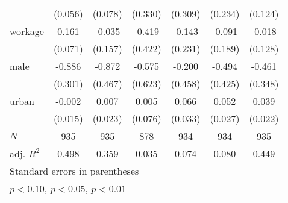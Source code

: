 {\begin{tabular}{l*{6}{c}}
            &     (0.056)         &     (0.078)         &     (0.330)         &     (0.309)         &     (0.234)         &     (0.124)         \\
[1em]
workage     &       0.161\sym{**} &      -0.035         &      -0.419         &      -0.143         &      -0.091         &      -0.018         \\
            &     (0.071)         &     (0.157)         &     (0.422)         &     (0.231)         &     (0.189)         &     (0.128)         \\
[1em]
male        &      -0.886\sym{***}&      -0.872\sym{*}  &      -0.575         &      -0.200         &      -0.494         &      -0.461         \\
            &     (0.301)         &     (0.467)         &     (0.623)         &     (0.458)         &     (0.425)         &     (0.348)         \\
[1em]
urban       &      -0.002         &       0.007         &       0.005         &       0.066\sym{*}  &       0.052\sym{*}  &       0.039\sym{*}  \\
            &     (0.015)         &     (0.023)         &     (0.076)         &     (0.033)         &     (0.027)         &     (0.022)         \\
\hline
\(N\)       &         935         &         935         &         878         &         934         &         934         &         935         \\
adj. \(R^{2}\)&       0.498         &       0.359         &       0.035         &       0.074         &       0.080         &       0.449         \\
\hline\hline
\multicolumn{7}{l}{\footnotesize Standard errors in parentheses}\\
\multicolumn{7}{l}{\footnotesize \sym{*} \(p<0.10\), \sym{**} \(p<0.05\), \sym{***} \(p<0.01\)}\\
\end{tabular}
}
